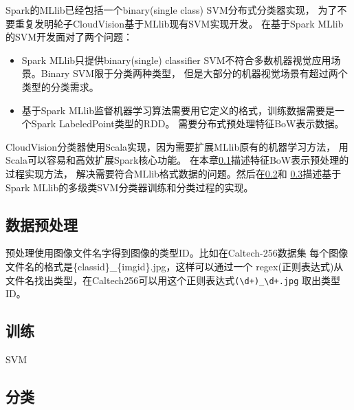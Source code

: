 Spark的MLlib已经包括一个binary(single class) SVM分布式分类器实现，
为了不要重复发明轮子CloudVision基于MLlib现有SVM实现开发。
在基于Spark MLlib的SVM开发面对了两个问题：
\begin{itemize}
  \item Spark MLlib只提供binary(single) classifier SVM不符合多数机器视觉应用场景。Binary SVM限于分类两种类型，
        但是大部分的机器视觉场景有超过两个类型的分类需求。
  \item 基于Spark MLlib监督机器学习算法需要用它定义的格式，训练数据需要是一个Spark LabeledPoint类型的RDD。
        需要分布式预处理特征BoW表示数据。
\end{itemize}

CloudVision分类器使用Scala实现，因为需要扩展MLlib原有的机器学习方法，
用Scala可以容易和高效扩展Spark核心功能。
在本章\ref{subsec:classifier-preprocessing}描述特征BoW表示预处理的过程实现方法，
解决需要符合MLlib格式数据的问题。然后在\ref{subsec:classifier-training}和
\ref{subsec:classifier-label}描述基于Spark
MLlib的多级类SVM分类器训练和分类过程的实现。


\subsection{数据预处理}
\label{subsec:classifier-preprocessing}
预处理使用图像文件名字得到图像的类型ID。比如在Caltech-256数据集
每个图像文件名的格式是\{classid\}\_\{imgid\}.jpg，这样可以通过一个
regex(正则表达式)从文件名找出类型，在Caltech256可以用这个正则表达式\verb|(\d+)_\d+.jpg|
取出类型ID。




\subsection{训练}
\label{subsec:classifier-training}
SVM

\subsection{分类}
\label{subsec:classifier-label}

